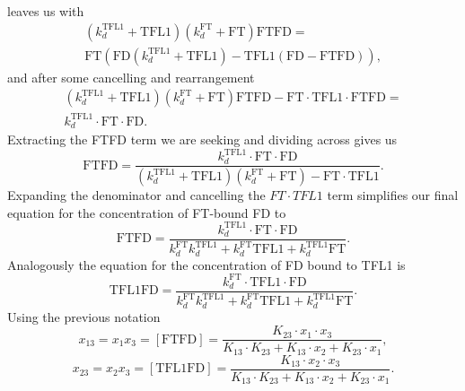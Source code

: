 leaves us with
\begin{multline*}
\left(k_d^{\mathrm{TFL1}} + \mathrm{TFL1}\right)\left(k_d^{\mathrm{FT}} + \mathrm{FT}\right)\mathrm{FTFD} = \\ \mathrm{FT}\left(\mathrm{FD}\left(k_d^{\mathrm{TFL1}} + \mathrm{TFL1}\right) - \mathrm{TFL1}\left(\mathrm{FD} - \mathrm{FTFD}\right)\right),
\end{multline*}
and after some cancelling and rearrangement
\begin{multline*}
\left(k_d^{\mathrm{TFL1}} + \mathrm{TFL1}\right)\left(k_d^{\mathrm{FT}} + \mathrm{FT}\right)\mathrm{FTFD} - \mathrm{FT}\cdot \mathrm{TFL1}\cdot \mathrm{FTFD} = \\ k_d^{\mathrm{TFL1}}\cdot \mathrm{FT}\cdot \mathrm{FD}.
\end{multline*}
Extracting the FTFD term we are seeking and dividing across gives us
\begin{equation*}
\mathrm{FTFD} = \frac{k_d^{\mathrm{TFL1}}\cdot \mathrm{FT}\cdot \mathrm{FD}}{\left(k_d^{\mathrm{TFL1}} + \mathrm{TFL1}\right)\left(k_d^{\mathrm{FT}} + \mathrm{FT}\right) - \mathrm{FT}\cdot \mathrm{TFL1}}.
\end{equation*}
Expanding the denominator and cancelling the $FT\cdot TFL1$ term simplifies our final equation for the concentration of FT-bound FD to
\begin{equation*}
\mathrm{FTFD} = \frac{k_d^{\mathrm{TFL1}}\cdot \mathrm{FT}\cdot \mathrm{FD}}{k_d^{\mathrm{FT}}k_d^{\mathrm{TFL1}} + k_d^{\mathrm{FT}}\mathrm{TFL1} + k_d^{\mathrm{TFL1}}\mathrm{FT}}.
\end{equation*}
Analogously the equation for the concentration of FD bound to TFL1 is
\begin{equation*}
\mathrm{TFL1FD} = \frac{k_d^{\mathrm{FT}}\cdot \mathrm{TFL1}\cdot \mathrm{FD}}{k_d^{\mathrm{FT}}k_d^{\mathrm{TFL1}} + k_d^{\mathrm{FT}}\mathrm{TFL1} + k_d^{\mathrm{TFL1}}\mathrm{FT}}.
\end{equation*}
Using the previous notation
\begin{equation*}
x_{13}=x_{1}x_3 = [ \mathrm{FTFD} ]=\frac{K_{23} \cdot x_1 \cdot x_3}{K_{13}\cdot K_{23} + K_{13}\cdot x_2 + K_{23} 
\cdot x_1},
\end{equation*}
\begin{equation*}
x_{23}=x_{2}x_3 = [ \mathrm{TFL1FD} ]=\frac{K_{13} \cdot x_2 \cdot x_3}{K_{13}\cdot K_{23} + K_{13}\cdot x_2 + K_{23}
\cdot x_1}.
\end{equation*}

